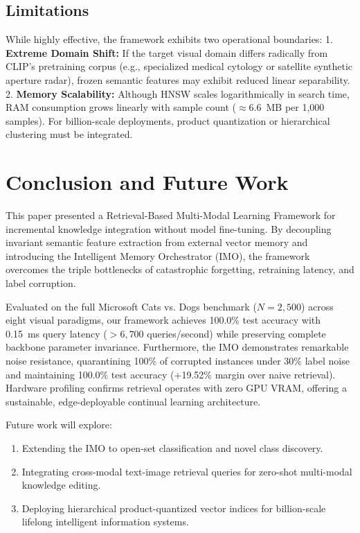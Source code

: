 \documentclass[sn-mathphys,Numbered]{sn-jnl}
\begin{document}
\subsection{Limitations}
While highly effective, the framework exhibits two operational boundaries:
1. \textbf{Extreme Domain Shift:} If the target visual domain differs radically from CLIP's pretraining corpus (e.g., specialized medical cytology or satellite synthetic aperture radar), frozen semantic features may exhibit reduced linear separability.
2. \textbf{Memory Scalability:} Although HNSW scales logarithmically in search time, RAM consumption grows linearly with sample count ($\approx 6.6$~MB per 1,000 samples). For billion-scale deployments, product quantization or hierarchical clustering must be integrated.


\section{Conclusion and Future Work}\label{sec:conclusion}

This paper presented a Retrieval-Based Multi-Modal Learning Framework for incremental knowledge integration without model fine-tuning. By decoupling invariant semantic feature extraction from external vector memory and introducing the Intelligent Memory Orchestrator (IMO), the framework overcomes the triple bottlenecks of catastrophic forgetting, retraining latency, and label corruption.

Evaluated on the full Microsoft Cats vs. Dogs benchmark ($N=2,500$) across eight visual paradigms, our framework achieves 100.0\% test accuracy with 0.15~ms query latency ($>6,700$ queries/second) while preserving complete backbone parameter invariance. Furthermore, the IMO demonstrates remarkable noise resistance, quarantining 100\% of corrupted instances under 30\% label noise and maintaining 100.0\% test accuracy (+19.52\% margin over naive retrieval). Hardware profiling confirms retrieval operates with zero GPU VRAM, offering a sustainable, edge-deployable continual learning architecture.

Future work will explore:
\begin{enumerate}
    \item Extending the IMO to open-set classification and novel class discovery.
    \item Integrating cross-modal text-image retrieval queries for zero-shot multi-modal knowledge editing.
    \item Deploying hierarchical product-quantized vector indices for billion-scale lifelong intelligent information systems.
\end{enumerate}
\end{document}
